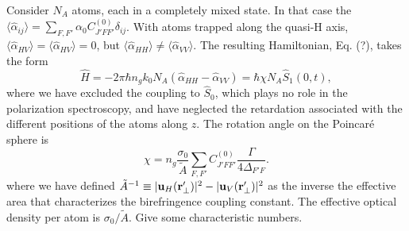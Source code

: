 \documentclass[preprint,aps,pra,onecolumn]{revtex4-1} %
\begin{document}
Consider $N_A$ atoms, each in a completely mixed state.  In that case the $\langle \hat{\alpha}_{ij} \rangle = \sum_{F,F'} \alpha_0 C_{J'FF'}^{(0)} \delta_{ij}$.  With atoms trapped along the quasi-H axis,  $\langle \hat{\alpha}_{HV} \rangle = \langle \hat{\alpha}_{HV} \rangle =0$, but  $\langle \hat{\alpha}_{HH} \rangle \neq  \langle \hat{\alpha}_{VV} \rangle$.  The resulting Hamiltonian, Eq. (?), takes the form
\begin{equation}
\hat{H} = -2\pi \hbar  n_g k_0 N_A \left(\hat{\alpha}_{HH} - \hat{\alpha}_{VV}\right) =\hbar \chi N_A \hat{S}_1(0,t),
\end{equation}
where we have excluded the coupling to $\hat{S}_0$, which plays no role in the polarization spectroscopy, and have neglected the retardation associated with the different positions of the atoms along $z$.  The rotation angle on the Poincar\'{e} sphere is
\begin{equation}
\chi = n_g  \frac{\sigma_0}{\tilde{A}}  \sum_{F,F'}  C_{J'FF'}^{(0)} \frac{\Gamma}{4 \Delta_{F'F}}.
\end{equation}
where we have defined $\tilde{A}^{-1} \equiv |\mathbf{u}_{H}(\mathbf{r}'_\perp)|^2 - |\mathbf{u}_{V}(\mathbf{r}'_\perp)| ^2 $ as the inverse the effective area that characterizes the birefringence coupling constant. The effective optical density per atom is $\sigma_0/\tilde{A}$.  {\color{red}  Give some characteristic numbers.}  
\end{document}
